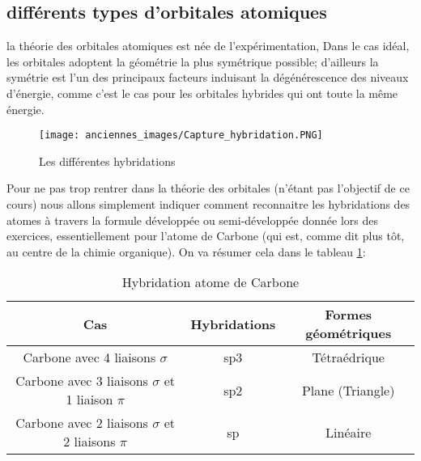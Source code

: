 \subsection{différents types d'orbitales atomiques}
la théorie des orbitales atomiques est née de l'expérimentation, Dans le cas idéal, les orbitales adoptent la géométrie la plus symétrique possible; d'ailleurs la symétrie est l'un des principaux facteurs induisant la dégénérescence des niveaux d'énergie, comme c'est le cas pour les orbitales hybrides qui ont toute la même énergie.
\begin{figure}[htbp]
    \begin{center}
        \texttt{[image: anciennes\_images/Capture\_hybridation.PNG]} 
    \end{center}
    \caption{Les différentes hybridations}
    \label{fig:hybridation}
\end{figure}
Pour ne pas trop rentrer dans la théorie des orbitales (n'étant pas l'objectif de ce cours) nous allons simplement indiquer comment reconnaitre les hybridations des atomes à travers la formule développée ou semi-développée donnée lors des exercices, essentiellement pour l'atome de Carbone (qui est, comme dit plus tôt, au centre de la chimie organique). On va résumer cela dans le tableau \ref{tab_hybridation}:
\begin{table}[!ht]
    \begin{center}
        \begin{tabular}{|c|c|c|}
            \hline
            \textbf{Cas} & \textbf{Hybridations} & \textbf{Formes géométriques} \\
            \hline
            Carbone avec 4 liaisons $\sigma$ & sp3 & Tétraédrique \\
            \hline
            Carbone avec 3 liaisons $\sigma$ et 1 liaison $\pi$ & sp2 & Plane (Triangle)\\
            \hline
            Carbone avec 2 liaisons $\sigma$  et 2 liaisons $\pi$ & sp & Linéaire\\
            \hline
        \end{tabular} 
    \end{center}
    \caption{Hybridation atome de Carbone}
    \label{tab_hybridation}
\end{table}

